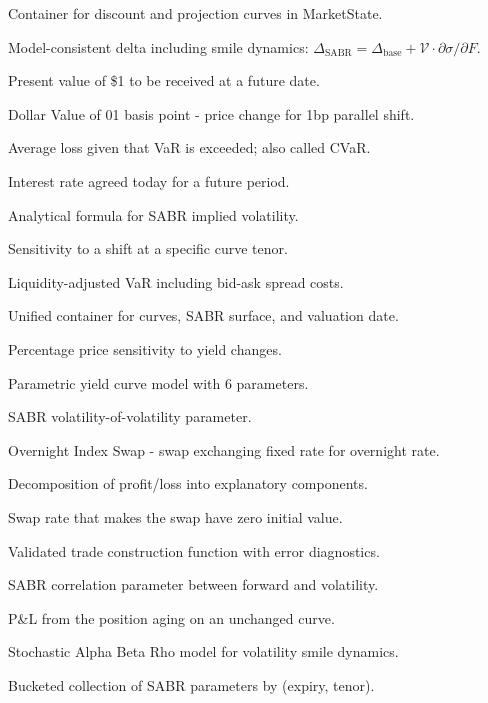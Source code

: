 \documentclass[12pt,a4paper]{report}
\begin{document}
\begin{description}[style=nextline]
    \item[CurveState] Container for discount and projection curves in MarketState.
    \item[Delta (SABR)] Model-consistent delta including smile dynamics: $\Delta_{\text{SABR}} = \Delta_{\text{base}} + \mathcal{V} \cdot \partial\sigma/\partial F$.
    \item[Discount Factor] Present value of \$1 to be received at a future date.
    \item[DV01] Dollar Value of 01 basis point - price change for 1bp parallel shift.
    \item[Expected Shortfall (ES)] Average loss given that VaR is exceeded; also called CVaR.
    \item[Forward Rate] Interest rate agreed today for a future period.
    \item[Hagan Approximation] Analytical formula for SABR implied volatility.
    \item[Key-Rate Duration] Sensitivity to a shift at a specific curve tenor.
    \item[LVaR] Liquidity-adjusted VaR including bid-ask spread costs.
    \item[MarketState] Unified container for curves, SABR surface, and valuation date.
    \item[Modified Duration] Percentage price sensitivity to yield changes.
    \item[Nelson-Siegel-Svensson (NSS)] Parametric yield curve model with 6 parameters.
    \item[Nu ($\nu$)] SABR volatility-of-volatility parameter.
    \item[OIS] Overnight Index Swap - swap exchanging fixed rate for overnight rate.
    \item[P\&L Attribution] Decomposition of profit/loss into explanatory components.
    \item[Par Rate] Swap rate that makes the swap have zero initial value.
    \item[Portfolio Builder] Validated trade construction function with error diagnostics.
    \item[Rho ($\rho$)] SABR correlation parameter between forward and volatility.
    \item[Roll-down] P\&L from the position aging on an unchanged curve.
    \item[SABR] Stochastic Alpha Beta Rho model for volatility smile dynamics.
    \item[SABR Surface] Bucketed collection of SABR parameters by (expiry, tenor).

\end{description}
\end{document}

